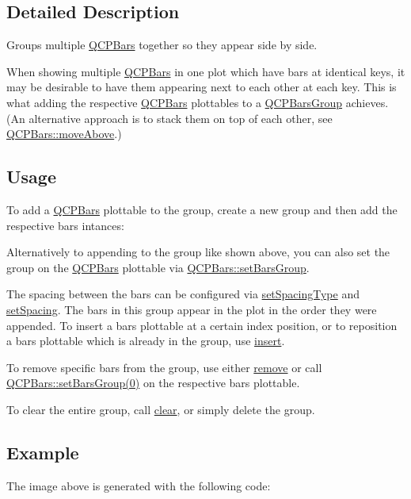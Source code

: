 \subsection{Detailed Description}
Groups multiple \hyperlink{class_q_c_p_bars}{Q\+C\+P\+Bars} together so they appear side by side. 



When showing multiple \hyperlink{class_q_c_p_bars}{Q\+C\+P\+Bars} in one plot which have bars at identical keys, it may be desirable to have them appearing next to each other at each key. This is what adding the respective \hyperlink{class_q_c_p_bars}{Q\+C\+P\+Bars} plottables to a \hyperlink{class_q_c_p_bars_group}{Q\+C\+P\+Bars\+Group} achieves. (An alternative approach is to stack them on top of each other, see \hyperlink{class_q_c_p_bars_ac22e00a6a41509538c21b04f0a57318c}{Q\+C\+P\+Bars\+::move\+Above}.)\hypertarget{class_q_c_p_bars_group_qcpbarsgroup-usage}{}\subsection{Usage}\label{class_q_c_p_bars_group_qcpbarsgroup-usage}
To add a \hyperlink{class_q_c_p_bars}{Q\+C\+P\+Bars} plottable to the group, create a new group and then add the respective bars intances\+: 
\begin{DoxyCodeInclude}
\end{DoxyCodeInclude}
Alternatively to appending to the group like shown above, you can also set the group on the \hyperlink{class_q_c_p_bars}{Q\+C\+P\+Bars} plottable via \hyperlink{class_q_c_p_bars_aedd1709061f0b307c47ddb45e172ef9a}{Q\+C\+P\+Bars\+::set\+Bars\+Group}.

The spacing between the bars can be configured via \hyperlink{class_q_c_p_bars_group_a2c7e2d61b10594a4555b615e1fcaf49e}{set\+Spacing\+Type} and \hyperlink{class_q_c_p_bars_group_aa553d327479d72a0c3dafcc724a190e2}{set\+Spacing}. The bars in this group appear in the plot in the order they were appended. To insert a bars plottable at a certain index position, or to reposition a bars plottable which is already in the group, use \hyperlink{class_q_c_p_bars_group_a309a5f7233db189f3ea9c2d04ece6c13}{insert}.

To remove specific bars from the group, use either \hyperlink{class_q_c_p_bars_group_a215e28a5944f1159013a0e19169220e7}{remove} or call \hyperlink{class_q_c_p_bars_aedd1709061f0b307c47ddb45e172ef9a}{Q\+C\+P\+Bars\+:\+:set\+Bars\+Group(0)} on the respective bars plottable.

To clear the entire group, call \hyperlink{class_q_c_p_bars_group_a3ddf23928c6cd89530bd34ab7ba7b177}{clear}, or simply delete the group.\hypertarget{class_q_c_p_bars_group_qcpbarsgroup-example}{}\subsection{Example}\label{class_q_c_p_bars_group_qcpbarsgroup-example}
The image above is generated with the following code\+: 
\begin{DoxyCodeInclude}
\end{DoxyCodeInclude}


